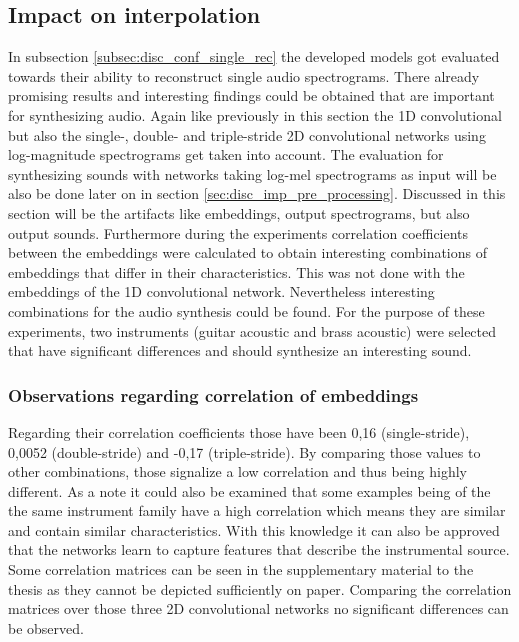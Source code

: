 \subsection{Impact on interpolation}
\label{subsec:disc_conf_inter}
In subsection \ref{subsec:disc_conf_single_rec} the developed models got evaluated towards their ability to reconstruct single audio spectrograms. There already promising results and interesting findings could be obtained that are important for synthesizing audio. Again like previously in this section the 1D convolutional but also the single-, double- and triple-stride 2D convolutional networks using log-magnitude spectrograms get taken into account. The evaluation for synthesizing sounds with networks taking log-mel spectrograms as input will be also be done later on in section \ref{sec:disc_imp_pre_processing}. Discussed in this section will be the artifacts like embeddings, output spectrograms, but also output sounds. Furthermore during the experiments correlation coefficients between the embeddings were calculated to obtain interesting combinations of embeddings that differ in their characteristics. This was not done with the embeddings of the 1D convolutional network. Nevertheless interesting combinations for the audio synthesis could be found. For the purpose of these experiments, two instruments (guitar acoustic and brass acoustic) were selected that have significant differences and should synthesize an interesting sound. 

\subsubsection{Observations regarding correlation of embeddings}
Regarding their correlation coefficients those have been 0,16 (single-stride), 0,0052 (double-stride) and -0,17 (triple-stride). By comparing those values to other combinations, those signalize a low correlation and thus being highly different. As a note it could also be examined that some examples being of the the same instrument family have a high correlation which means they are similar and contain similar characteristics. With this knowledge it can also be approved that the networks learn to capture features that describe the instrumental source. Some correlation matrices can be seen in the supplementary material to the thesis as they cannot be depicted sufficiently on paper. Comparing the correlation matrices over those three 2D convolutional networks no significant differences can be observed.

